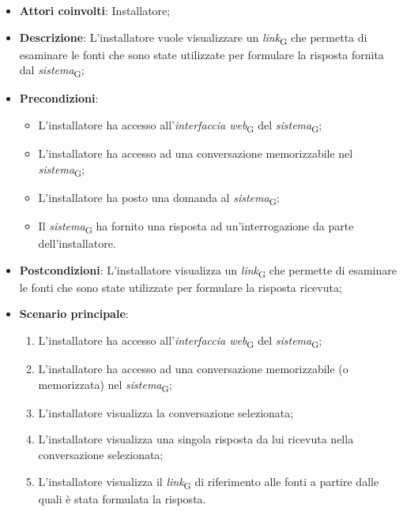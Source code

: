 \begin{itemize}
    \item \textbf{Attori coinvolti}: Installatore;
    \item \textbf{Descrizione}: L'installatore vuole visualizzare un  \textit{link}\textsubscript{G} che permetta di esaminare le fonti che sono state utilizzate per formulare la risposta fornita dal \textit{sistema}\textsubscript{G};
    \item \textbf{Precondizioni}: 
    \begin{itemize}
        \item L’installatore ha accesso all’\textit{interfaccia web}\textsubscript{G} del \textit{sistema}\textsubscript{G};
        \item L’installatore ha accesso ad una conversazione memorizzabile nel \textit{sistema}\textsubscript{G};
        \item L'installatore ha posto una domanda al \textit{sistema}\textsubscript{G};
        \item Il \textit{sistema}\textsubscript{G} ha fornito una risposta ad un’interrogazione da parte dell’installatore.
    \end{itemize}
    \item \textbf{Postcondizioni}: L'installatore visualizza un  \textit{link}\textsubscript{G} che permette di esaminare le fonti che sono state utilizzate per formulare la risposta ricevuta;
    \item \textbf{Scenario principale}:
    \begin{enumerate}
        \item L’installatore ha accesso all’\textit{interfaccia web}\textsubscript{G} del \textit{sistema}\textsubscript{G};
        \item L’installatore ha accesso ad una conversazione memorizzabile (o memorizzata) nel \textit{sistema}\textsubscript{G};
        \item L'installatore visualizza la conversazione selezionata;
        \item L'installatore visualizza una singola risposta da lui ricevuta nella conversazione selezionata;
        \item L'installatore visualizza il  \textit{link}\textsubscript{G} di riferimento alle fonti a partire dalle quali è stata formulata la risposta.
    \end{enumerate}
\end{itemize}

